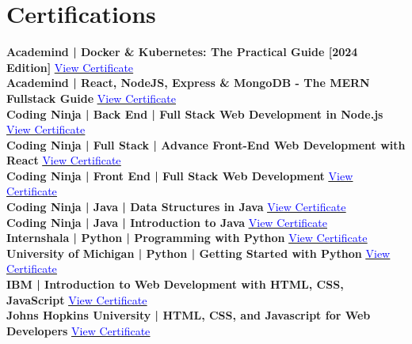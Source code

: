 \documentclass[a4paper,11pt]{article}
\begin{document}
\section{\textbf{Certifications}}
 \begin{itemize}[leftmargin=0.05in, label={}]
    \small{\item{
     \textbf{Academind | Docker \& Kubernetes: The Practical Guide [2024 Edition]} \hfill \href{https://ude.my/UC-f43f277f-e127-4813-ab71-325f4945ebc2}{\underline{\faExternalLink* \textcolor{blue}{View Certificate}}} \\
     \textbf{Academind | React, NodeJS, Express \& MongoDB - The MERN Fullstack Guide} \hfill \href{https://ude.my/UC-cd908c89-5436-42dd-bd10-1059cc3d04b9/}{\underline{\faExternalLink* \textcolor{blue}{View Certificate}}} \\
     \textbf{Coding Ninja | Back End | Full Stack Web Development in Node.js} \hfill \href{https://certificate.codingNinjas.com/verify/4b825fbfe923e5dc}{\underline{\faExternalLink* \textcolor{blue}{View Certificate}}} \\
     \textbf{Coding Ninja | Full Stack | Advance Front-End Web Development with React} \hfill \href{https://certificate.codingNinjas.com/verify/de3f76e500774984}{\underline{\faExternalLink* \textcolor{blue}{View Certificate}}} \\
     \textbf{Coding Ninja | Front End | Full Stack Web Development} \hfill \href{https://certificate.codingNinjas.com/verify/4ef06b6c397be0a0}{\underline{\faExternalLink* \textcolor{blue}{View Certificate}}} \\
     \textbf{Coding Ninja | Java | Data Structures in Java} \hfill \href{https://certificate.codingNinjas.com/verify/1d13d9c65ac1c550}{\underline{\faExternalLink* \textcolor{blue}{View Certificate}}} \\
     \textbf{Coding Ninja | Java | Introduction to Java} \hfill \href{https://certificate.codingNinjas.com/verify/a4caa1b3f000159c}{\underline{\faExternalLink* \textcolor{blue}{View Certificate}}} \\
     \textbf{Internshala | Python | Programming with Python} \hfill \href{https://trainings.internshala.com/s/v/1265006/72d53389}{\underline{\faExternalLink* \textcolor{blue}{View Certificate}}} \\
     \textbf{University of Michigan | Python | Getting Started with Python} \hfill \href{https://coursera.org/verify/5YBKRX2THX8R}{\underline{\faExternalLink* \textcolor{blue}{View Certificate}}} \\
     \textbf{IBM | Introduction to Web Development with HTML, CSS, JavaScript} \hfill \href{https://coursera.org/verify/N4LT8U7Y7TPC}{\underline{\faExternalLink* \textcolor{blue}{View Certificate}}} \\
     \textbf{Johns Hopkins University | HTML, CSS, and Javascript for Web Developers} \hfill \href{https://coursera.org/verify/35T79558QRCF}{\underline{\faExternalLink* \textcolor{blue}{View Certificate}}} \\
    }}
 \end{itemize}
 \vspace{-16pt}
\end{document}
